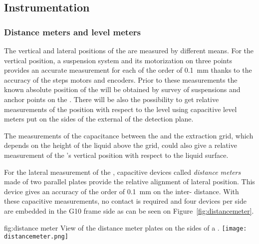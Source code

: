 \subsection{Instrumentation}
\label{sec:fddp-crp-instr}

\subsubsection{Distance meters and level meters}

The vertical and lateral positions of the  are measured by different means. 
For the vertical position, %
 a suspension system and its motorization on three points provides an accurate measurement for each  of the order of \SI{0.1}{mm} thanks to the accuracy of the steps motors and encoders. 
 Prior to these measurements the known absolute position of the  will be obtained by survey of suspensions and anchor points on the . There will be also the possibility to get relative measurements of the  position with respect to the \lar level using capacitive level meters put on the sides of the  external  of the detection plane. 
 
The  measurements of the capacitance between the  and the extraction grid, which depends on the height of the liquid above the grid, could also give a relative measurement  of the 's vertical position with respect to the liquid surface.

For the lateral measurement of the , capacitive devices called \textit{distance meters} made of two parallel plates %
provide the relative alignment of   lateral position. This device gives an accuracy of the order of \SI{0.1}{mm} on the  inter- distance. 
With these capacitive measurements, no contact is required and four devices per  side are embedded in the G10 frame side as can be seen on Figure~\ref{fig:distancemeter}.

\begin{dunefigure}{fig:distance meter}
{View of the distance meter plates on the sides of a .}
\texttt{[image: distancemeter.png]}
\end{dunefigure}

